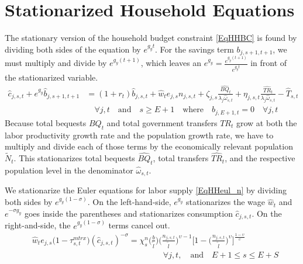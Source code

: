 \section{Stationarized Household Equations}\label{SecStnrzHH}

  The stationary version of the household budget constraint \eqref{EqHHBC} is found by dividing both sides of the equation by $e^{g_y t}$. For the savings term $b_{j,s+1,t+1}$, we must multiply and divide by $e^{g_y(t+1)}$, which leaves an $e^{g_y} = \frac{e^{g_y(t+1)}}{e^{g_y t}}$ in front of the stationarized variable.
  \begin{equation}\label{EqStnrzHHBCstat}
    \begin{split}
      \hat{c}_{j,s,t} + e^{g_y}\hat{b}_{j,s+1,t+1} &= (1 + r_{t})\hat{b}_{j,s,t} + \hat{w}_t e_{j,s} n_{j,s,t} + \zeta_{j,s}\frac{\hat{BQ}_t}{\lambda_j\hat{\omega}_{s,t}} + \eta_{j,s,t}\frac{\hat{TR}_{t}}{\lambda_j\hat{\omega}_{s,t}} - \hat{T}_{s,t}  \\
      &\quad\forall j,t\quad\text{and}\quad s\geq E+1 \quad\text{where}\quad b_{j,E+1,t}=0\quad\forall j,t
    \end{split}
  \end{equation}
  Because total bequests $BQ_t$ and total government transfers $TR_t$ grow at both the labor productivity growth rate and the population growth rate, we have to multiply and divide each of those terms by the economically relevant population $\tilde{N}_t$. This stationarizes total bequests $\hat{BQ}_t$, total transfers $\hat{TR}_t$, and the respective population level in the denominator $\hat{\omega}_{s,t}$.

  We stationarize the Euler equations for labor supply \eqref{EqHHeul_n} by dividing both sides by $e^{g_y(1-\sigma)}$. On the left-hand-side, $e^{g_y}$ stationarizes the wage $\hat{w}_t$ and $e^{-\sigma g_y}$ goes inside the parentheses and stationarizes consumption $\hat{c}_{j,s,t}$. On the right-and-side, the $e^{g_y(1-\sigma)}$ terms cancel out.
  \begin{equation}\label{EqStnrzHHeul_n}
    \begin{split}
      &\hat{w}_t e_{j,s}\bigl(1 - \tau^{mtrx}_{s,t}\bigr)(\hat{c}_{j,s,t})^{-\sigma} = \chi^n_{s}\biggl(\frac{b}{\tilde{l}}\biggr)\biggl(\frac{n_{j,s,t}}{\tilde{l}}\biggr)^{\upsilon-1}\Biggl[1 - \biggl(\frac{n_{j,s,t}}{\tilde{l}}\biggr)^\upsilon\Biggr]^{\frac{1-\upsilon}{\upsilon}} \\
      &\qquad\qquad\qquad\qquad\qquad\qquad\qquad\qquad\forall j,t, \quad\text{and}\quad E+1\leq s\leq E+S \\
    \end{split}
  \end{equation}

